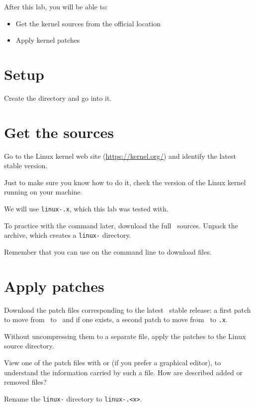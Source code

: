 
After this lab, you will be able to:
\begin{itemize}
\item Get the kernel sources from the official location
\item Apply kernel patches
\end{itemize}

\section{Setup}

Create the  directory and go into it.

\section{Get the sources}

Go to the Linux kernel web site (\url{https://kernel.org/}) and
identify the latest stable version.

Just to make sure you know how to do it, check the version of the
Linux kernel running on your machine.

We will use \texttt{linux-\workingkernel.x}, which this lab was tested with.

To practice with the  command later, download the full \texttt\basekernel\
sources. Unpack the archive, which creates a \texttt{linux-\basekernel}
directory.

Remember that you can use  on the command
line to download files.

\section{Apply patches}

Download the patch files corresponding to the latest \texttt\workingkernel\ stable
release: a first patch to move from \texttt\basekernel\ to \texttt\workingkernel\ and if one exists, a second patch to move from \texttt\basekernel\ to \texttt{\workingkernel.x}.

Without uncompressing them to a separate file, apply the patches to the Linux
source directory.


View one of the patch files with  or 
(if you prefer a graphical editor), to understand the information carried
by such a file. How are described added or removed files?

Rename the \texttt{linux-\basekernel} directory to \texttt{linux-\workingkernel.<x>}.
